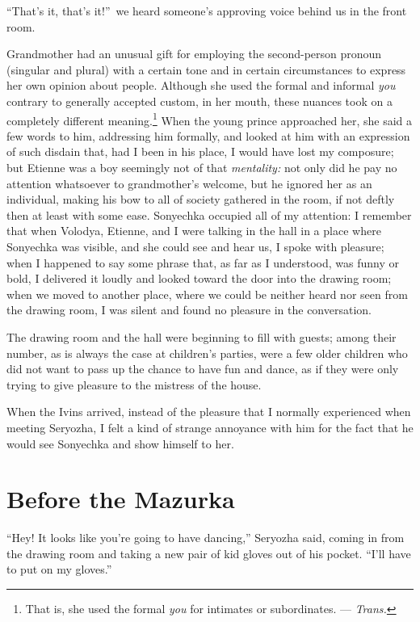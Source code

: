 ``That's it, that's it!''~we heard someone's approving voice behind us in the front room.

Grandmother had an unusual gift for employing the second-person pronoun (singular and plural) with a certain tone and in certain circumstances to express her own opinion about people. Although she used the formal and informal \textit{you} contrary to generally accepted custom, in her mouth, these nuances took on a completely different meaning.\footnote{That is, she used the formal \textit{you} for intimates or subordinates. --- \textit{Trans.}} When the young prince approached her, she said a few words to him, addressing him formally, and looked at him with an expression of such disdain that, had I been in his place, I would have lost my composure; but Etienne was a boy seemingly not of that \emph{mentality:} not only did he pay no attention whatsoever to grandmother's welcome, but he ignored her as an individual, making his bow to all of society gathered in the room, if not deftly then at least with some ease. Sonyechka occupied all of my attention: I remember that when Volodya, Etienne, and I were talking in the hall in a place where Sonyechka was visible, and she could see and hear us, I spoke with pleasure; when I happened to say some phrase that, as far as I understood, was funny or bold, I delivered it loudly and looked toward the door into the drawing room; when we moved to another place, where we could be neither heard nor seen from the drawing room, I was silent and found no pleasure in the conversation. 

The drawing room and the hall were beginning to fill with guests; among their number, as is always the case at children's parties, were a few older children who did not want to pass up the chance to have fun and dance, as if they were only trying to give pleasure to the mistress of the house.

When the Ivins arrived, instead of the pleasure that I normally experienced when meeting Seryozha, I felt a kind of strange annoyance with him for the fact that he would see Sonyechka and show himself to her.

\chapter{Before the Mazurka} %

``Hey! It looks like you're going to have dancing,'' Seryozha said, coming in from the drawing room and taking a new pair of kid gloves out of his pocket. ``I'll have to put on my gloves.'' %

